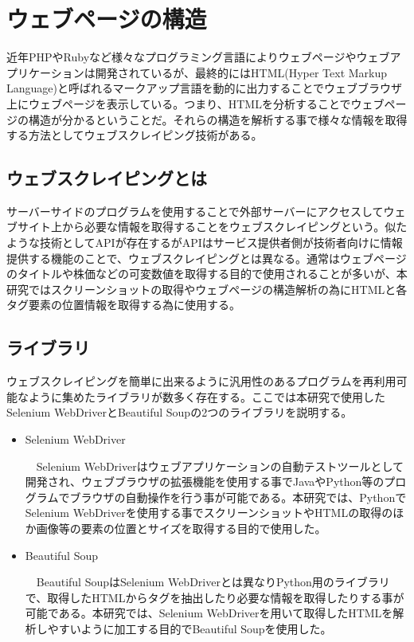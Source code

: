 \renewcommand{\baselinestretch}{1.5} %
\section{ウェブページの構造}\label{sec:scraping}
\renewcommand{\baselinestretch}{1} %
\par 近年PHPやRubyなど様々なプログラミング言語によりウェブページやウェブアプリケーションは開発されているが、最終的にはHTML(Hyper Text Markup Language)と呼ばれるマークアップ言語\cite{mozilla_html}を動的に出力することでウェブブラウザ上にウェブページを表示している。つまり、HTMLを分析することでウェブページの構造が分かるということだ。それらの構造を解析する事で様々な情報を取得する方法としてウェブスクレイピング技術がある。
\subsection{ウェブスクレイピングとは}
\par サーバーサイドのプログラムを使用することで外部サーバーにアクセスしてウェブサイト上から必要な情報を取得することをウェブスクレイピングという\cite{ntt_scraping}。似たような技術としてAPIが存在するがAPIはサービス提供者側が技術者向けに情報提供する機能のことで、ウェブスクレイピングとは異なる。通常はウェブページのタイトルや株価などの可変数値を取得する目的で使用されることが多いが、本研究ではスクリーンショットの取得やウェブページの構造解析の為にHTMLと各タグ要素の位置情報を取得する為に使用する。

\subsection{ライブラリ}
\par ウェブスクレイピングを簡単に出来るように汎用性のあるプログラムを再利用可能なように集めたライブラリが数多く存在する。ここでは本研究で使用したSelenium WebDriver\cite{selenium}とBeautiful Soup\cite{beautifulsoup}の2つのライブラリを説明する。

\begin{itemize}
    \item Selenium WebDriver
    \par ~~Selenium WebDriverはウェブアプリケーションの自動テストツールとして開発され、ウェブブラウザの拡張機能を使用する事でJavaやPython等のプログラムでブラウザの自動操作を行う事が可能である。本研究では、PythonでSelenium WebDriverを使用する事でスクリーンショットやHTMLの取得のほか画像等の要素の位置とサイズを取得する目的で使用した。 \\

    \item Beautiful Soup
    \par ~~Beautiful SoupはSelenium WebDriverとは異なりPython用のライブラリで、取得したHTMLからタグを抽出したり必要な情報を取得したりする事が可能である。本研究では、Selenium WebDriverを用いて取得したHTMLを解析しやすいように加工する目的でBeautiful Soupを使用した。 \\
\end{itemize}
